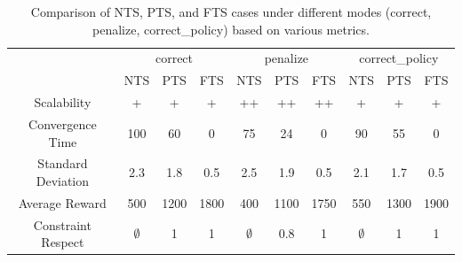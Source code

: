 \documentclass[runningheads]{llncs}
\theoremstyle{freethm}
\theoremstyle{proofoutline}
\begin{document}
\begin{table}[h!]
    \centering
    \caption{Comparison of NTS, PTS, and FTS cases under different modes (correct, penalize, correct\_policy) based on various metrics.\\}\label{tab:results}
    \setlength{\tabcolsep}{5pt}
    \begin{tabular}{cccccccccc}
        \cline{2-10}
                           & \multicolumn{3}{c}{correct} & \multicolumn{3}{c}{penalize} & \multicolumn{3}{c}{correct\_policy}                                                         \\
        \cline{2-10}
                           & NTS                         & PTS                          & FTS                                 & NTS         & PTS  & FTS  & NTS         & PTS  & FTS  \\
        \hline
        Scalability        & +                         & +                          & +                                 & ++         & ++  & ++  & +         & +  & +  \\
        Convergence Time   & 100                         & 60                           & 0                                   & 75          & 24   & 0    & 90          & 55   & 0    \\
        Standard Deviation & 2.3                         & 1.8                          & 0.5                                 & 2.5         & 1.9  & 0.5  & 2.1         & 1.7  & 0.5  \\
        Average Reward     & 500                         & 1200                         & 1800                                & 400         & 1100 & 1750 & 550         & 1300 & 1900 \\
        Constraint Respect & $\emptyset$                 & 1                            & 1                                   & $\emptyset$ & 0.8  & 1    & $\emptyset$ & 1    & 1    \\
    \end{tabular}
\end{table}
%
%
%
%
%
\end{document}
